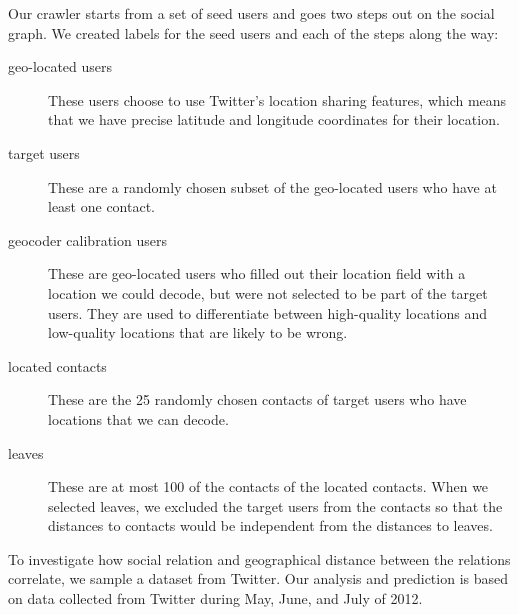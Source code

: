 Our crawler starts from a set of seed users and goes two steps out on the
social graph.
%
We created labels for the seed users and each of the steps along the way:

\begin{description}
\item[geo-located users] These users choose to use Twitter's location sharing
    features, which means that we have precise latitude and longitude
    coordinates for their location.
\item[target users] These are a randomly chosen subset of the geo-located users
    who have at least one contact.
\item[geocoder calibration users] These are geo-located users who filled out their
    location field with a location we could decode, but were not selected to be
    part of the target users. They are used to differentiate between
    high-quality locations and low-quality locations that are likely to be
    wrong.
\item[located contacts] These are the 25 randomly chosen contacts of
    target users who have locations that we can decode.
\item[leaves] These are at most 100 of the contacts of the located contacts.
    When we selected leaves, we excluded the target users from the contacts so
    that the distances to contacts would be independent from the distances to
    leaves.
\end{description}


To investigate how social relation and geographical distance between the
relations correlate, we sample a dataset from Twitter.
%
Our analysis and prediction is based on data collected from Twitter during
May, June, and July of 2012.

